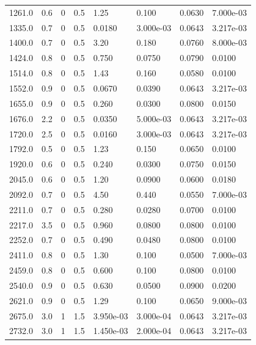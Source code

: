 \documentclass[preview]{standalone}
\begin{document}
{{\begin{tabular}{L{1.2cm}C{1.2cm} C{0.3cm}C{0.5cm} C{1.4cm}C{1.4cm} C{1.4cm}C{1.4cm}}
  1261.0  &   0.6  & 0     & 0.5 &  1.25  & 0.100  & 0.0630 &  7.000e-03   \\ 
  1335.0  &   0.7  & 0     & 0.5 &  0.0180  & 3.000e-03  & 0.0643 &  3.217e-03   \\ 
  1400.0  &   0.7  & 0     & 0.5 &  3.20  & 0.180  & 0.0760 &  8.000e-03   \\ 
  1424.0  &   0.8  & 0     & 0.5 &  0.750  & 0.0750  & 0.0790 &  0.0100   \\ 
  1514.0  &   0.8  & 0     & 0.5 &  1.43  & 0.160  & 0.0580 &  0.0100   \\ 
  1552.0  &   0.9  & 0     & 0.5 &  0.0670  & 0.0390  & 0.0643 &  3.217e-03   \\ 
  1655.0  &   0.9  & 0     & 0.5 &  0.260  & 0.0300  & 0.0800 &  0.0150   \\ 
  1676.0  &   2.2  & 0     & 0.5 &  0.0350  & 5.000e-03  & 0.0643 &  3.217e-03   \\ 
  1720.0  &   2.5  & 0     & 0.5 &  0.0160  & 3.000e-03  & 0.0643 &  3.217e-03   \\ 
  1792.0  &   0.5  & 0     & 0.5 &  1.23  & 0.150  & 0.0650 &  0.0100   \\ 
  1920.0  &   0.6  & 0     & 0.5 &  0.240  & 0.0300  & 0.0750 &  0.0150   \\ 
  2045.0  &   0.6  & 0     & 0.5 &  1.20  & 0.0900  & 0.0600 &  0.0180   \\ 
  2092.0  &   0.7  & 0     & 0.5 &  4.50  & 0.440  & 0.0550 &  7.000e-03   \\ 
  2211.0  &   0.7  & 0     & 0.5 &  0.280  & 0.0280  & 0.0700 &  0.0100   \\ 
  2217.0  &   3.5  & 0     & 0.5 &  0.960  & 0.0800  & 0.0800 &  0.0100   \\ 
  2252.0  &   0.7  & 0     & 0.5 &  0.490  & 0.0480  & 0.0800 &  0.0100   \\ 
  2411.0  &   0.8  & 0     & 0.5 &  1.30  & 0.100  & 0.0500 &  7.000e-03   \\ 
  2459.0  &   0.8  & 0     & 0.5 &  0.600  & 0.100  & 0.0800 &  0.0100   \\ 
  2540.0  &   0.9  & 0     & 0.5 &  0.630  & 0.0500  & 0.0900 &  0.0200   \\ 
  2621.0  &   0.9  & 0     & 0.5 &  1.29  & 0.100  & 0.0650 &  9.000e-03   \\ 
  2675.0  &   3.0  & 1     & 1.5 &  3.950e-03  & 3.000e-04  & 0.0643 &  3.217e-03   \\ 
  2732.0  &   3.0  & 1     & 1.5 &  1.450e-03  & 2.000e-04  & 0.0643 &  3.217e-03   \\ 

\end{tabular}}}
\end{document}
